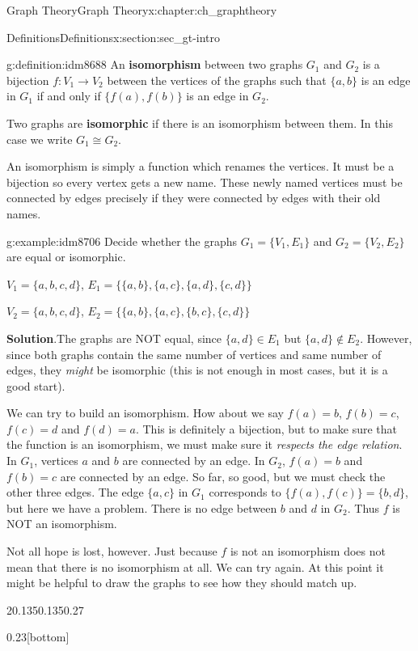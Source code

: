 \documentclass[oneside,10pt,]{book}
\newcommand{\terminology}[1]{\textbf{#1}}
\numberwithin{equation}{chapter}
\def\isom{\cong}
\begin{document}
\begin{chapterptx}{Graph Theory}{}{Graph Theory}{}{}{x:chapter:ch_graphtheory}
\begin{sectionptx}{Definitions}{}{Definitions}{}{}{x:section:sec_gt-intro}
\begin{definition}{}{g:definition:idm8688}%
 An \terminology{isomorphism} between two graphs \(G_1\) and \(G_2\) is a bijection \(f:V_1 \to V_2\) between the vertices of the graphs such that \(\{a,b\}\) is an edge in \(G_1\) if and only if \(\{f(a), f(b)\}\) is an edge in \(G_2\).%
\par
Two graphs are \terminology{isomorphic} if there is an isomorphism between them. In this case we write \(G_1 \isom G_2\).%
\end{definition}
An isomorphism is simply a function which renames the vertices. It must be a bijection so every vertex gets a new name. These newly named vertices must be connected by edges precisely if they were connected by edges with their old names.%
\begin{example}{}{g:example:idm8706}%
Decide whether the graphs \(G_1 = \{V_1, E_1\}\) and \(G_2 = \{V_2, E_2\}\) are equal or isomorphic.%
\par
\(V_1 = \{a,b,c,d\}\), \(E_1 = \{\{a,b\}, \{a,c\}, \{a,d\}, \{c,d\}\}\)%
\par
\(V_2 = \{a,b,c,d\}\), \(E_2 = \{\{a,b\}, \{a,c\}, \{b,c\}, \{c,d\}\}\)%
\par\smallskip%
\noindent\textbf{Solution}.\hypertarget{g:solution:idm8717}{}\quad{}The graphs are NOT equal, since \(\{a,d\} \in E_1\) but \(\{a,d\} \notin E_2\). However, since both graphs contain the same number of vertices and same number of edges, they \emph{might} be isomorphic (this is not enough in most cases, but it is a good start).%
\par
We can try to build an isomorphism. How about we say \(f(a) = b\), \(f(b) = c\), \(f(c) = d\) and \(f(d) = a\). This is definitely a bijection, but to make sure that the function is an isomorphism, we must make sure it \emph{respects the edge relation}. In \(G_1\), vertices \(a\) and \(b\) are connected by an edge. In \(G_2\), \(f(a) = b\) and \(f(b) = c\) are connected by an edge. So far, so good, but we must check the other three edges. The edge \(\{a,c\}\) in \(G_1\) corresponds to \(\{f(a), f(c)\} = \{b,d\}\), but here we have a problem. There is no edge between \(b\) and \(d\) in \(G_2\). Thus \(f\) is NOT an isomorphism.%
\par
Not all hope is lost, however. Just because \(f\) is not an isomorphism does not mean that there is no isomorphism at all. We can try again. At this point it might be helpful to draw the graphs to see how they should match up.%
\begin{sidebyside}{2}{0.135}{0.135}{0.27}%
\begin{sbspanel}{0.23}[bottom]%
\end{sbspanel}
\end{sidebyside}
\end{example}
\end{sectionptx}
\end{chapterptx}
\end{document}
